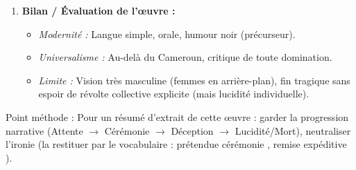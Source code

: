 \documentclass[11pt]{article}
\newcommand{\cle}[1]{{\popxbold\color{popdark}#1}}
\begin{document}
\begin{methode}
\begin{enumerate}
\begin{itemize}
    \end{itemize}
    \item \textbf{Bilan / Évaluation de l'œuvre :} 
    \begin{itemize}
        \item \emph{Modernité :} Langue simple, orale, humour noir (précurseur).
        \item \emph{Universalisme :} Au-delà du Cameroun, critique de toute domination.
        \item \emph{Limite :} Vision très masculine (femmes en arrière-plan), fin tragique sans espoir de révolte collective explicite (mais lucidité individuelle).
    \end{itemize}
\end{enumerate}
\cle{Point méthode} : Pour un résumé d'extrait de cette œuvre : garder la progression narrative (Attente $\rightarrow$ Cérémonie $\rightarrow$ Déception $\rightarrow$ Lucidité/Mort), neutraliser l'ironie (la restituer par le vocabulaire : \og prétendue cérémonie \fg{}, \og remise expéditive \fg{}).
\end{methode}
\end{document}
